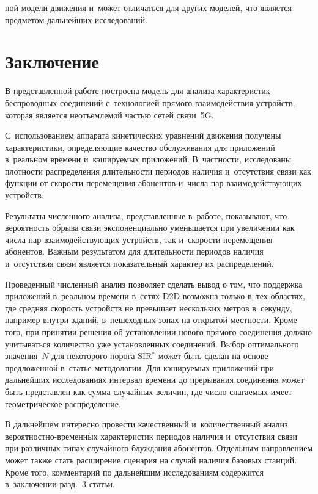 \begin{multicols}{2}

\noindent
ной модели движения и~может отличаться для 
других моделей, что является предметом дальнейших исследований. 

\vspace*{-6pt}

\section{Заключение}

\vspace*{-2pt}

  В представленной работе построена модель для анализа характеристик 
беспроводных соединений с~технологией прямого взаимодействия устройств, 
которая является неотъемлемой частью сетей связи~5G. 

С~использованием аппарата кинетических уравнений движения получены 
характеристики, определяющие качество обслуживания для приложений 
в~реальном времени и~кэшируемых приложений. В~частности, исследованы 
плотности распределения длительности периодов наличия и~отсутствия связи 
как функции от скорости перемещения абонентов и~числа пар 
взаимодействующих устройств.
  
  Результаты численного анализа, представленные в~работе, показывают, что 
вероятность обрыва связи экспоненциально уменьшается при увеличении как 
числа пар взаимодействующих устройств, так и~скорости перемещения 
абонентов. Важным результатом для длительности периодов наличия 
и~отсутствия связи является показательный характер их распределений.
  
  Проведенный численный анализ позволяет сделать вывод о том, что 
поддержка приложений в~реальном времени в~сетях D2D возможна только в~тех 
областях, где средняя скорость устройств не превышает нескольких метров 
в~секунду, например внутри зданий, в~пешеходных зонах на открытой 
местности. Кроме того, при принятии решения об установлении нового 
прямого соединения должно учитываться количество уже установленных 
соединений. Выбор оптимального значения~$N$ для некоторого порога 
SIR$^*$ может быть сделан на основе предложенной в~статье методологии. Для 
кэшируемых приложений при дальнейших исследованиях интервал времени до 
прерывания соединения может быть представлен как сумма случайных 
величин, где число слагаемых имеет геометрическое распределение.
  
  В дальнейшем интересно провести качественный и~количественный анализ 
ве\-ро\-ят\-ност\-но-вре\-мен\-н$\acute{\mbox{ы}}$х характеристик периодов наличия 
и~отсутствия связи при различных типах случайного блужда\-ния абонентов. 
Отдельным направлением может также стать расширение сценария на случай 
наличия базовых станций. Кроме того, комментарий по дальнейшим 
исследованиям содержится в~заключении разд.~3 статьи.
  

\end{multicols}
